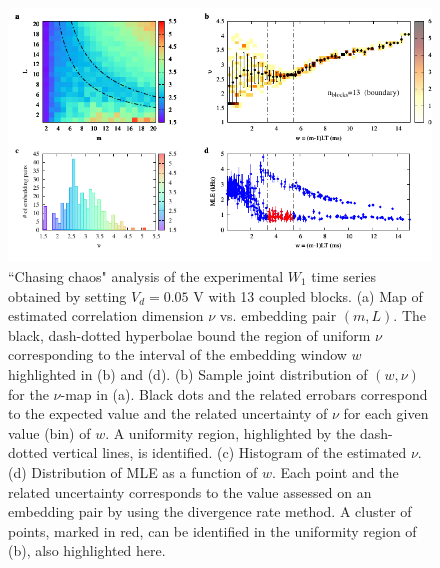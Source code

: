 \begin{figure}[H]
    \centering
    \includegraphics[width=\linewidth]{../blocks/13_blocks/edge/2e5_points/plots/chaos_low.pdf}
    \caption{``Chasing chaos" analysis of the experimental $W_1$ time series obtained by setting $V_d=0.05$ V with 13 coupled blocks.
    (a) Map of estimated correlation dimension $\nu$ vs. embedding pair $(m, L)$.
    The black, dash-dotted hyperbolae bound the region of uniform $\nu$ corresponding to the interval of the
    embedding window $w$ highlighted in (b) and (d).
    (b) Sample joint distribution of $(w,\nu)$ for the $\nu$-map in (a).
    Black dots and the related errobars correspond to the expected value and the related uncertainty of $\nu$
    for each given value (bin) of $w$. A uniformity region, highlighted by the dash-dotted vertical lines,
    is identified. (c) Histogram of the estimated $\nu$. (d) Distribution of MLE as a function of $w$. Each point and the related
    uncertainty corresponds to the value assessed on an embedding pair by using the divergence rate method.
    A cluster of points, marked in red, can be identified in the uniformity region of (b), also highlighted here.}
    \label{fig:13 blocks chaos}
\end{figure}

